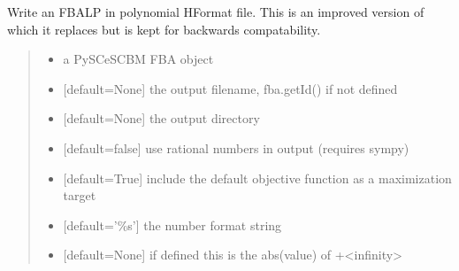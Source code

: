 \documentclass[letterpaper,12pt,english]{sphinxmanual}
\begin{document}
\begin{fulllineitems}

\pysigstartsignatures
\pysiglinewithargsret
{}
{\sphinxparamcomma {}\sphinxparamcomma {}\sphinxparamcomma {}\sphinxparamcomma {}\sphinxparamcomma {}\sphinxparamcomma {}}
{}
\pysigstopsignatures
\sphinxAtStartPar
Write an FBA\sphinxhyphen{}LP in polynomial H\sphinxhyphen{}Format file. This is an improved version of  which it replaces but is kept for backwards compatability.
\begin{quote}\begin{description}
\begin{itemize}
\item {} 
\sphinxAtStartPar
{} \textendash{} a PySCeS\sphinxhyphen{}CBM FBA object

\item {} 
\sphinxAtStartPar
{} \textendash{} {[}default=None{]} the output filename, fba.getId() if not defined

\item {} 
\sphinxAtStartPar
{} \textendash{} {[}default=None{]} the output directory

\item {} 
\sphinxAtStartPar
{} \textendash{} {[}default=false{]} use rational numbers in output (requires sympy)

\item {} 
\sphinxAtStartPar
{} \textendash{} {[}default=True{]} include the default objective function as a maximization target

\item {} 
\sphinxAtStartPar
{} \textendash{} {[}default=’\%s’{]} the number format string

\item {} 
\sphinxAtStartPar
{} \textendash{} {[}default=None{]} if defined this is the abs(value) of +\sphinxhyphen{}\textless{}infinity\textgreater{}

\end{itemize}

\end{description}\end{quote}

\end{fulllineitems}
\end{document}
